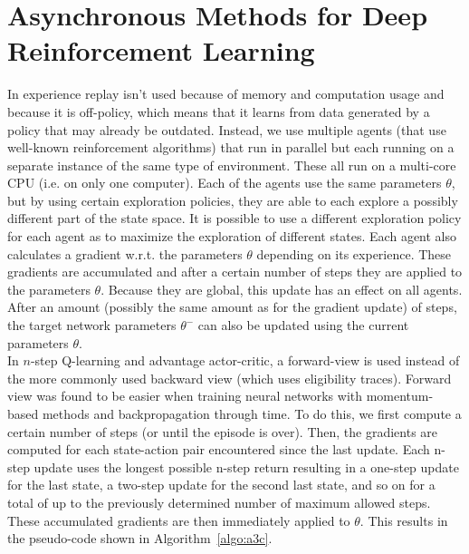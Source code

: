 \documentclass[a4paper, 11pt]{article}
\begin{document}
\section{Asynchronous Methods for Deep Reinforcement Learning}
In \cite{Mnih2016AsynchronousLearning} experience replay isn't used because of memory and computation usage and because it is off-policy, which means that it learns from data generated by a policy that may already be outdated. Instead, we use multiple agents (that use well-known reinforcement algorithms) that run in parallel but each running on a separate instance of the same type of environment. These all run on a multi-core CPU (i.e. on only one computer). Each of the agents use the same parameters $\theta$, but by using certain exploration policies, they are able to each explore a possibly different part of the state space. It is possible to use a different exploration policy for each agent as to maximize the exploration of different states. Each agent also calculates a gradient w.r.t. the parameters $\theta$ depending on its experience. These gradients are accumulated and after a certain number of steps they are applied to the parameters $\theta$. Because they are global, this update has an effect on all agents. After an amount (possibly the same amount as for the gradient update) of steps, the target network parameters $\theta^{-}$ can also be updated using the current parameters $\theta$.\\
In $n$-step Q-learning and advantage actor-critic, a forward-view is used instead of the more commonly used backward view (which uses eligibility traces). Forward view was found to be easier when training neural networks with momentum-based methods and backpropagation through time. To do this, we first compute a certain number of steps (or until the episode is over). Then, the gradients are computed for each state-action pair encountered since the last update. Each n-step update uses the longest possible n-step return resulting in a one-step update for the last state, a two-step update for the second last state, and so on for a total of up to the previously determined number of maximum allowed steps. These accumulated gradients are then immediately applied to $\theta$. This results in the pseudo-code shown in Algorithm~\ref{algo:a3c}.\\
\end{document}
